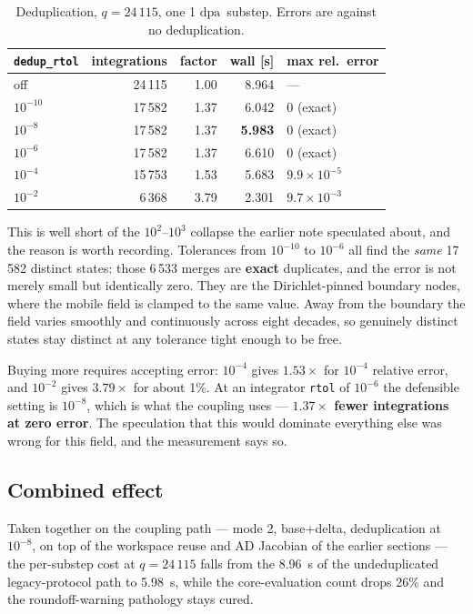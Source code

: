 \documentclass[11pt,a4paper]{article}
\newcommand{\code}[1]{\texttt{\small #1}}
\newcommand{\dpa}{\ensuremath{\mathrm{dpa}}}
\begin{document}
\begin{table}[htb]
\centering
\caption{Deduplication, $q=24\,115$, one 1 \dpa\ substep. Errors are against no
deduplication.}
\label{tab:rec3}
\begin{tabular}{lrrrl}
\toprule
\code{dedup\_rtol} & integrations & factor & wall [s] & max rel.\ error \\
\midrule
off        & 24\,115 & 1.00 & 8.964 & --- \\
$10^{-10}$ & 17\,582 & 1.37 & 6.042 & $0$ (exact) \\
$10^{-8}$  & 17\,582 & 1.37 & \textbf{5.983} & $0$ (exact) \\
$10^{-6}$  & 17\,582 & 1.37 & 6.610 & $0$ (exact) \\
$10^{-4}$  & 15\,753 & 1.53 & 5.683 & $9.9\times10^{-5}$ \\
$10^{-2}$  &  6\,368 & 3.79 & 2.301 & $9.7\times10^{-3}$ \\
\bottomrule
\end{tabular}
\end{table}

This is well short of the $10^{2}$--$10^{3}$ collapse the earlier note
speculated about, and the reason is worth recording. Tolerances from $10^{-10}$
to $10^{-6}$ all find the \emph{same} 17\,582 distinct states: those 6\,533
merges are \textbf{exact} duplicates, and the error is not merely small but
identically zero. They are the Dirichlet-pinned boundary nodes, where the mobile
field is clamped to the same value. Away from the boundary the field varies
smoothly and continuously across eight decades, so genuinely distinct states
stay distinct at any tolerance tight enough to be free.

Buying more requires accepting error: $10^{-4}$ gives $1.53\times$ for
$10^{-4}$ relative error, and $10^{-2}$ gives $3.79\times$ for about 1\%. At an
integrator \code{rtol} of $10^{-6}$ the defensible setting is $10^{-8}$, which
is what the coupling uses --- \textbf{$1.37\times$ fewer integrations at zero
error}. The speculation that this would dominate everything else was wrong for
this field, and the measurement says so.

\subsection{Combined effect}

Taken together on the coupling path --- mode 2, base+delta, deduplication at
$10^{-8}$, on top of the workspace reuse and AD Jacobian of the earlier
sections --- the per-substep cost at $q=24\,115$ falls from the 8.96~s of the
undeduplicated legacy-protocol path to 5.98~s, while the core-evaluation count
drops 26\% and the roundoff-warning pathology stays cured.
\end{document}
